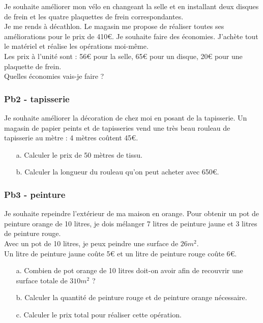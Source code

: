 Je souhaite améliorer mon vélo en changeant la selle et en installant deux disques de frein et les quatre plaquettes de frein correspondantes. \\

Je me rends à décathlon. Le magasin me propose de réaliser toutes ses améliorations pour le prix de 410€. Je souhaite faire des économies. J'achète tout le matériel et réalise les opérations moi-même. \\

Les prix à l'unité sont : 56€ pour la selle, 65€ pour un disque, 20€ pour une plaquette de frein.\\

Quelles économies vais-je faire ?

\subsubsection*{Pb2 - tapisserie}

Je souhaite améliorer la décoration de chez moi en posant de la tapisserie. Un magasin de papier peints et de tapisseries vend une très beau rouleau de tapisserie au mètre : 4 mètres coûtent 45€.

\begin{enumerate}
  \item[a.] Calculer le prix de 50 mètres de tissu.
  \item[b.] Calculer la longueur du rouleau qu'on peut acheter avec 650€.
\end{enumerate}  


\subsubsection*{Pb3 - peinture} 

Je souhaite repeindre l'extérieur de ma maison en orange. Pour obtenir un pot de peinture orange de 10 litres, je dois mélanger 7 litres de peinture jaune et 3 litres de peinture rouge.\\ 

Avec un pot de 10 litres, je peux peindre une surface de $26m^2$. \\

Un litre de peinture jaune coûte 5€ et un litre de peinture rouge coûte 6€. 

\begin{enumerate}
  \item[a.] Combien de pot orange de 10 litres doit-on avoir afin de recouvrir une surface totale de $310m^2$ ?
  \item[b.] Calculer la quantité de peinture rouge et de peinture orange nécessaire.
  \item[c.] Calculer le prix total pour réaliser cette opération.  
\end{enumerate}

